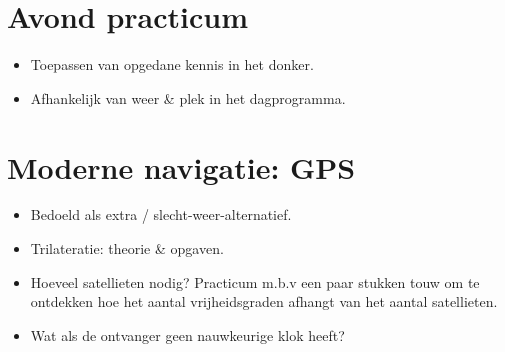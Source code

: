 \documentclass[a4paper,10pt]{article}
\begin{document}
\section{Avond practicum}
\begin{itemize}
 \item Toepassen van opgedane kennis in het donker.
 \item Afhankelijk van weer \& plek in het dagprogramma.
\end{itemize}

\section{Moderne navigatie: GPS}
\begin{itemize}
 \item Bedoeld als extra / slecht-weer-alternatief.
 \item Trilateratie: theorie \& opgaven.
 \item Hoeveel satellieten nodig? Practicum m.b.v een paar stukken touw om te ontdekken hoe het aantal vrijheidsgraden afhangt van het aantal satellieten.
 \item Wat als de ontvanger geen nauwkeurige klok heeft?
\end{itemize}
\end{document}
